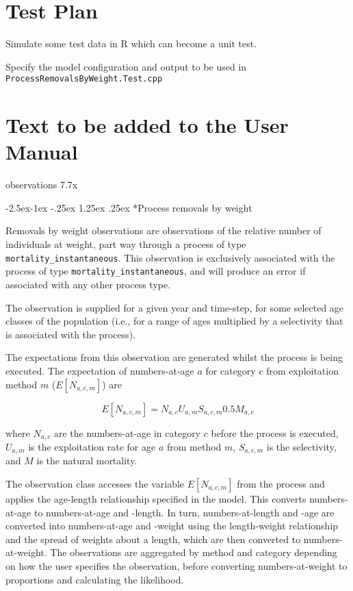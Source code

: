 \documentclass[a4paper,11pt,twoside,pdftex,draft]{article}
\makeatletter
\renewcommand\paragraph{\@startsection{paragraph}{4}{\z@}%
{-2.5ex\@plus -1ex \@minus -.25ex}%
{1.25ex \@plus .25ex}%
{\normalfont\normalsize\bfseries}}
\makeatother
\begin{document}
\section{Test Plan}

Simulate some test data in R which can become a unit test.

Specify the model configuration and output to be used in \texttt{ProcessRemovalsByWeight.Test.cpp}

\section{Text to be added to the User Manual}

observations 7.7x

\paragraph*{Process removals by weight}

Removals by weight observations are observations of the relative number of individuals at weight, part way through a process of type \texttt{mortality\_instantaneous}. This observation is exclusively associated with the process of type \texttt{mortality\_instantaneous}, and will produce an error if associated with any other process type.

The observation is supplied for a given year and time-step, for some selected age classes of the population (i.e., for a range of ages multiplied by a selectivity that is associated with the process).

The expectations from this observation are generated whilst the process is being executed. The expectation of numbers-at-age $a$ for category $c$ from exploitation method $m$ ($E[N_{a,c,m}]$) are

\begin{equation}
E[N_{a,c,m}] = N_{a,c} U_{a,m} S_{a,c,m} 0.5 M_{a,c}
\end{equation}

where $N_{a,c}$ are the numbers-at-age in category $c$ before the process is executed, $U_{a,m}$ is the exploitation rate for age $a$ from method $m$, $S_{a,c,m}$ is the selectivity, and $M$ is the natural mortality.

The observation class accesses the variable $E[N_{a,c,m}]$ from the process and applies the age-length relationship specified in the model. This converts numbers-at-age to numbers-at-age and -length. In turn, numbers-at-length and -age are converted into numbers-at-age and -weight using the length-weight relationship and the spread of weights about a length, which are then converted to numbers-at-weight.  The observations are aggregated by method and category depending on how the user specifies the observation, before converting numbers-at-weight to proportions and calculating the likelihood.
\end{document}
